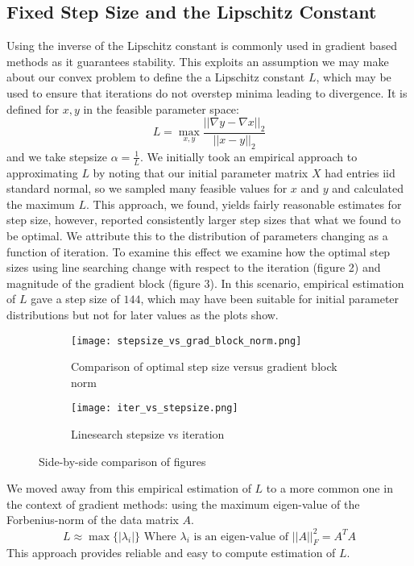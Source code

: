 \documentclass{article}
\begin{document}
\subsection{Fixed Step Size and the Lipschitz Constant}
Using the inverse of the Lipschitz constant is commonly used in gradient based methods as it guarantees stability. This exploits an assumption we may make about our convex problem to define the a Lipschitz constant $L$, which may be used to ensure that iterations do not overstep minima leading to divergence. It is defined for $x,y$ in the feasible parameter space:
$$L = \max_{x,y} \frac{||\nabla y - \nabla x||_2}{||x - y||_2}$$
and we take stepsize $\alpha=\frac{1}{L}$.
We initially took an empirical approach to approximating $L$ by noting that our initial parameter matrix $X$ had entries iid standard normal, so we sampled many feasible values for $x$ and $y$ and calculated the maximum $L$. This approach, we found, yields fairly reasonable estimates for step size, however, reported consistently larger step sizes that what we found to be optimal. We attribute this to the distribution of parameters changing as a function of iteration. To examine this effect we examine how the optimal step sizes using line searching change with respect to the iteration (figure 2) and magnitude of the gradient block (figure 3). In this scenario, empirical estimation of $L$ gave a step size of $144$, which may have been suitable for initial parameter distributions but not for later values as the plots show.
\begin{figure}[H]
    \centering
    \begin{subfigure}[b]{0.45\linewidth}  %
        \centering
        \texttt{[image: stepsize\_vs\_grad\_block\_norm.png]}
        \caption{Comparison of optimal step size versus gradient block norm}
        \label{fig:stepsize_block}
    \end{subfigure}
    \hfill
    \begin{subfigure}[b]{0.45\linewidth}  %
        \centering
        \texttt{[image: iter\_vs\_stepsize.png]}
        \caption{Linesearch stepsize vs iteration}
        \label{fig:enter-label}
    \end{subfigure}
    \caption{Side-by-side comparison of figures}
    \label{fig:side_by_side}
\end{figure}
We moved away from this empirical estimation of $L$ to a more common one in the context of gradient methods: using the maximum eigen-value of the Forbenius-norm of the data matrix $A$.
$$L\approx\max\{|\lambda_i|\} \text{ Where } \lambda_i \text{ is an eigen-value of }||A||_F^2 = A^TA$$
This approach provides reliable and easy to compute estimation of $L$.
\end{document}
